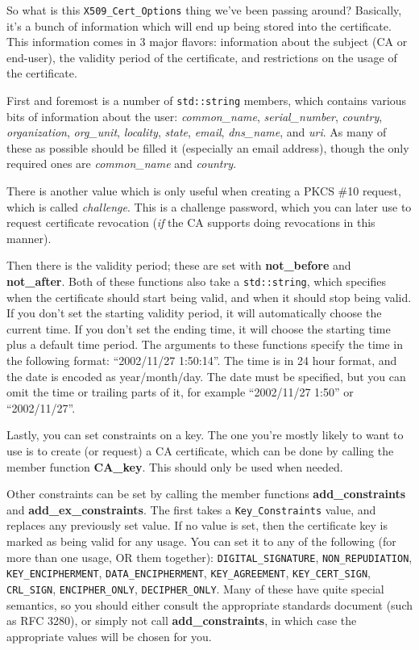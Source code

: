\documentclass{article}
\newcommand{\function}[1]{\textbf{#1}}
\newcommand{\type}[1]{\texttt{#1}}
\renewcommand{\arg}[1]{\textsl{#1}}
\begin{document}
So what is this \type{X509\_Cert\_Options} thing we've been passing around?
Basically, it's a bunch of information which will end up being stored into the
certificate. This information comes in 3 major flavors: information about the
subject (CA or end-user), the validity period of the certificate, and
restrictions on the usage of the certificate.

First and foremost is a number of \type{std::string} members, which contains
various bits of information about the user: \arg{common\_name},
\arg{serial\_number}, \arg{country}, \arg{organization}, \arg{org\_unit},
\arg{locality}, \arg{state}, \arg{email}, \arg{dns\_name}, and \arg{uri}. As
many of these as possible should be filled it (especially an email address),
though the only required ones are \arg{common\_name} and \arg{country}.

There is another value which is only useful when creating a PKCS \#10 request,
which is called \arg{challenge}. This is a challenge password, which you can
later use to request certificate revocation (\emph{if} the CA supports doing
revocations in this manner).

Then there is the validity period; these are set with \function{not\_before}
and \function{not\_after}. Both of these functions also take a
\type{std::string}, which specifies when the certificate should start being
valid, and when it should stop being valid. If you don't set the starting
validity period, it will automatically choose the current time. If you don't
set the ending time, it will choose the starting time plus a default time
period. The arguments to these functions specify the time in the following
format: ``2002/11/27 1:50:14''. The time is in 24 hour format, and the date is
encoded as year/month/day. The date must be specified, but you can omit the
time or trailing parts of it, for example ``2002/11/27 1:50'' or
``2002/11/27''.

Lastly, you can set constraints on a key. The one you're mostly likely to want
to use is to create (or request) a CA certificate, which can be done by calling
the member function \function{CA\_key}. This should only be used when needed.

Other constraints can be set by calling the member functions
\function{add\_constraints} and \function{add\_ex\_constraints}. The first takes
a \type{Key\_Constraints} value, and replaces any previously set value. If no
value is set, then the certificate key is marked as being valid for any usage.
You can set it to any of the following (for more than one usage, OR them
together): \type{DIGITAL\_SIGNATURE}, \type{NON\_REPUDIATION},
\type{KEY\_ENCIPHERMENT}, \type{DATA\_ENCIPHERMENT}, \type{KEY\_AGREEMENT},
\type{KEY\_CERT\_SIGN}, \type{CRL\_SIGN}, \type{ENCIPHER\_ONLY},
\type{DECIPHER\_ONLY}. Many of these have quite special semantics, so you
should either consult the appropriate standards document (such as RFC 3280), or
simply not call \function{add\_constraints}, in which case the appropriate
values will be chosen for you.
\end{document}
